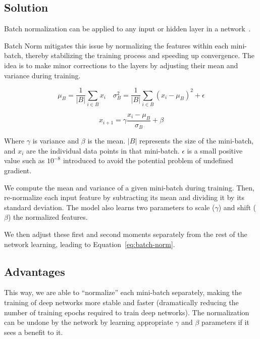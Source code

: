 \documentclass[11pt]{article}
\begin{document}
\subsection{Solution}

Batch normalization can be applied to any input or hidden layer in a network~\cite{Goodfellow-et-al-2016}.

Batch Norm mitigates this issue by normalizing the features within each mini-batch, thereby stabilizing the training process and speeding up convergence. The idea is to make minor corrections to the layers by adjusting their mean and variance during training.

\begin{equation*}
    \mu_B = \frac 1 {|B|}\sum_{i\in B} x_i \quad \sigma^2_B = \frac 1 {|B|} \sum _{i\in B} (x_i - \mu_B)^2 + \epsilon
\end{equation*}

\begin{equation}
    x_{i+1} = \gamma \frac{x_i - \mu_B}{\sigma_B} + \beta\label{eq:batch-norm}
\end{equation}

\begin{center}
Where $\gamma$ is variance and $\beta$ is the mean. $|B|$ represents the size of the mini-batch, and $x_i$ are the individual data points in that mini-batch. $\epsilon$ is a small positive value such as $10^{-8}$ introduced to avoid the potential problem of undefined gradient.
\end{center}

We compute the mean and variance of a given mini-batch during training. Then, re-normalize each input feature by subtracting its mean and dividing it by its standard deviation. The model also learns two parameters to scale ($\gamma$) and shift ($\beta$) the normalized features. 

We then adjust these first and second moments separately from the rest of the network learning, leading to Equation~\ref{eq:batch-norm}. 

\subsection{Advantages}

This way, we are able to ``normalize'' each mini-batch separately, making the training of deep networks more stable and faster (dramatically reducing the number of training epochs required to train deep networks). The normalization can be undone by the network by learning appropriate $\gamma$ and $\beta$ parameters if it sees a benefit to it.
\end{document}

